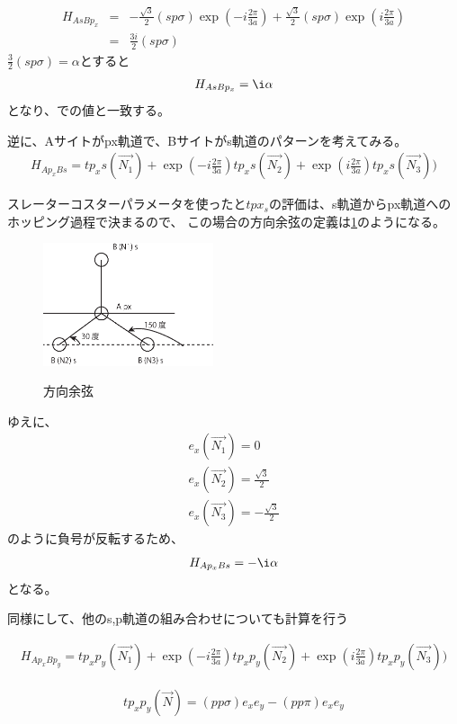 \documentclass{article}
\begin{document}
\begin{eqnarray}
H_{As Bp_x}&=&-\frac{\sqrt{3}}{2}(sp\sigma)
\exp(-i\frac{2\pi}{3a})+\frac{\sqrt{3}}{2}(sp\sigma) \exp(i\frac{2\pi}{3a})
\\ \nonumber
&=&\frac{3i}{2}(sp\sigma)
\end{eqnarray}
$\frac{3}{2}(sp\sigma)=\alpha$とすると
\begin{eqnarray}
H_{As Bp_x}=\i\alpha
\end{eqnarray}
となり、\cite{Hongki}での値と一致する。

逆に、Aサイトがpx軌道で、Bサイトがs軌道のパターンを考えてみる。
\begin{eqnarray}
H_{Ap_x Bs}=tp_xs(\vec{N_1})+\exp (-i\frac{2\pi}{3a})tp_xs(\vec{N_2})+\exp
(i\frac{2\pi}{3a})tp_xs(\vec{N_3}))
\end{eqnarray}

スレーターコスターパラメータを使ったと$tpx_s$の評価は、s軌道からpx軌道へのホッピング過程で決まるので、
この場合の方向余弦の定義は\ref{ex2}のようになる。

\begin{figure}[hbtp]
\centering
\includegraphics[width=5cm]{hopping2.eps}
\label{ex2}
\caption{方向余弦}
\end{figure}

ゆえに、
\begin{eqnarray}
e_x(\vec{N_1})=0 \\
e_x(\vec{N_2})=\frac{\sqrt{3}}{2} \\
e_x(\vec{N_3})=-\frac{\sqrt{3}}{2}
\end{eqnarray}
のように負号が反転するため、
\begin{eqnarray}
H_{Ap_x Bs}=-\i\alpha
\end{eqnarray}
となる。

同様にして、他のs,p軌道の組み合わせについても計算を行う

\begin{eqnarray}
H_{Ap_x Bp_y}=tp_xp_y(\vec{N_1})+\exp (-i\frac{2\pi}{3a})tp_xp_y(\vec{N_2})+\exp
(i\frac{2\pi}{3a})tp_xp_y(\vec{N_3}))
\end{eqnarray}

\begin{eqnarray}
tp_xp_y(\vec{N})=(pp\sigma)e_xe_y -(pp\pi)e_xe_y
\end{eqnarray}
\end{document}
